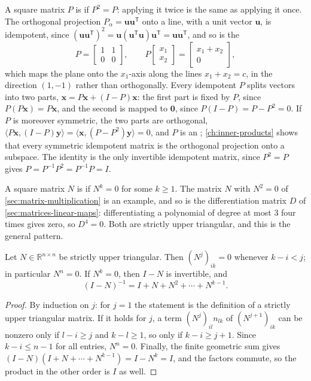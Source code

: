 A square matrix $P$ is  if $P^2=P$: applying it twice is the same as applying it once. The orthogonal projection $P_\alpha=\mathbf u\mathbf u^{\mathsf T}$ onto a line, with a unit vector $\mathbf u$, is idempotent, since $(\mathbf u\mathbf u^{\mathsf T})^2=\mathbf u(\mathbf u^{\mathsf T}\mathbf u)\mathbf u^{\mathsf T}=\mathbf u\mathbf u^{\mathsf T}$, and so is the 
\[
P=\begin{bmatrix}1&1\\0&0\end{bmatrix},\qquad P\begin{bmatrix}x_1\\x_2\end{bmatrix}=\begin{bmatrix}x_1+x_2\\0\end{bmatrix},
\]
which maps the plane onto the $x_1$-axis along the lines $x_1+x_2=c$, in the direction $(1,-1)$ rather than orthogonally. Every idempotent $P$ splits vectors into two parts, $\mathbf x=P\mathbf x+(I-P)\mathbf x$: the first part is fixed by $P$, since $P(P\mathbf x)=P\mathbf x$, and the second is mapped to $\mathbf 0$, since $P(I-P)=P-P^2=0$. If $P$ is moreover symmetric, the two parts are orthogonal, $\langle P\mathbf x,(I-P)\mathbf y\rangle=\langle\mathbf x,(P-P^2)\mathbf y\rangle=0$, and $P$ is an ; \cref{ch:inner-products} shows that every symmetric idempotent matrix is the orthogonal projection onto a subspace. The identity is the only invertible idempotent matrix, since $P^2=P$ gives $P=P^{-1}P^2=P^{-1}P=I$.

A square matrix $N$ is  if $N^k=0$ for some $k\ge1$. The matrix $N$ with $N^2=0$ of \cref{sec:matrix-multiplication} is an example, and so is the differentiation matrix $D$ of \cref{sec:matrices-linear-maps}: differentiating a polynomial of degree at most $3$ four times gives zero, so $D^4=0$. Both are strictly upper triangular, and this is the general pattern.

\begin{proposition}
\label{prop:nilpotent}
Let $N\in\mathbb R^{n\times n}$ be strictly upper triangular. Then $(N^j)_{ik}=0$ whenever $k-i<j$; in particular $N^n=0$. If $N^k=0$, then $I-N$ is invertible, and
\[
(I-N)^{-1}=I+N+N^2+\cdots+N^{k-1}.
\]
\end{proposition}

\begin{proof}
By induction on $j$: for $j=1$ the statement is the definition of a strictly upper triangular matrix. If it holds for $j$, a term $(N^j)_{il}n_{lk}$ of $(N^{j+1})_{ik}$ can be nonzero only if $l-i\ge j$ and $k-l\ge1$, so only if $k-i\ge j+1$. Since $k-i\le n-1$ for all entries, $N^n=0$. Finally, the finite geometric sum gives $(I-N)(I+N+\cdots+N^{k-1})=I-N^k=I$, and the factors commute, so the product in the other order is $I$ as well.
\end{proof}

